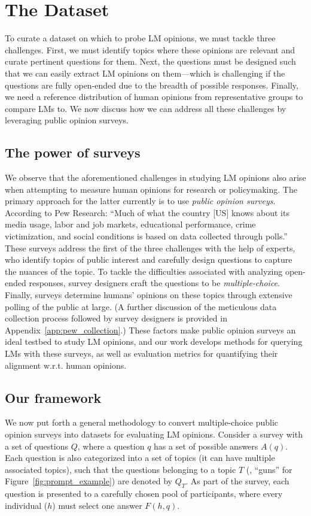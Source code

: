 \section{The \bname Dataset}
\label{sec:benchmark}

To curate a dataset on which to probe LM opinions, we must tackle three challenges.
First, we must identify topics where these opinions are relevant and curate pertinent questions for them.
Next, the questions must be designed such that we can easily extract LM opinions on them---which is challenging if the questions are fully open-ended due to the breadth of possible responses.
Finally, we need a reference distribution of human opinions from representative groups to compare LMs to.
We now discuss how we can address all these challenges by leveraging public opinion surveys.

\subsection{The power of surveys}
We observe that the aforementioned challenges in studying LM opinions also arise when attempting to measure human opinions for research or policymaking. 
The primary approach for the latter currently is to use \emph{public opinion surveys}.
According to Pew Research: ``Much of what the country [US] knows about its media usage, labor and job markets, educational performance, crime victimization, and social conditions is based on data collected through polls.''
These surveys address the first of the three challenges with the help of experts, who identify topics of public interest and carefully design questions to capture the nuances of the topic. 
To tackle the difficulties associated with analyzing open-ended responses, survey designers craft the questions to be \emph{multiple-choice}.
Finally, surveys determine humans' opinions on these topics through extensive polling of the public at large. 
(A further discussion of the meticulous data collection process followed by survey designers is provided in Appendix~\ref{app:pew_collection}.)
These factors make public opinion surveys an ideal testbed to study LM opinions, and our work develops methods for querying LMs with these surveys, as well as evaluation metrics for quantifying their alignment w.r.t. human opinions.


\subsection{Our framework}
\label{sec:methodology}
We now put forth a general methodology to convert multiple-choice public opinion surveys into datasets for evaluating LM opinions.
Consider a survey with a set of questions $Q$, where a question $q$ has a set of possible answers $A(q)$.
Each question is also categorized into a set of topics (it can have multiple associated topics), such that the questions belonging to a topic $T$ (\eg, ``guns'' for Figure~\ref{fig:prompt_example}) are denoted by $Q_T$. 
As part of the survey, each question is presented to a carefully chosen pool of participants, where every individual ($h$) must select one answer $F(h, q)$.

